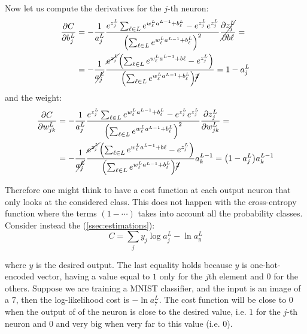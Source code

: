 Now let us compute the derivatives for the $j$-th neuron:
\begin{equation}
\begin{aligned}
\frac{\pr C}{\pr b\jL} &= -\frac{1}{a\jL} \frac{e^{z\jL}\sum_{\ell \in L}e^{ w_{\ell}^L a^{L-1}+b_\ell^L} -e^{z\jL}e^{z\jL}}{\br{\sum_{\ell \in L}e^{ w_{\ell}^L a^{L-1} +b_\ell^L}}^2} \cancel{\frac{\pr z\jL}{\pr b\ell}} = \\
&= -\frac{1}{\cancel{a\jL}} \frac{ \cancel{e^{z\jL}} \br{\sum_{\ell \in L}e^{ w_{\ell}^L a^{L-1} +b\ell} -e^{z\jL}}}{\br{\sum_{\ell \in L}e^{ w_{\ell}^L a^{L-1} +b_\ell^L}}\cancel{^2}}= 1- a\jL
\end{aligned}
\end{equation}
and the weight:
\begin{equation}
\begin{aligned}
\frac{\pr C}{\pr w_{jk}^L} &= -\frac{1}{a\jL} \frac{e^{z\jL}\sum_{\ell \in L}e^{ w_{\ell}^L a^{L-1}+b_\ell^L} -e^{z\jL}e^{z\jL}}{\br{\sum_{\ell \in L}e^{ w_{\ell}^L a^{L-1} +b_\ell^L}}^2} \frac{\pr z\jL}{\pr w_{jk}^L} = \\
&= -\frac{1}{\cancel{a\jL}} \frac{ \cancel{e^{z\jL}} \br{\sum_{\ell \in L}e^{ w_{\ell}^L a^{L-1} +b\ell} -e^{z\jL}}}{\br{\sum_{\ell \in L}e^{ w_{\ell}^L a^{L-1} +b_\ell^L}}\cancel{^2}} a_k^{L-1}= \br{1- a\jL} a_k^{L-1}
\end{aligned}
\end{equation}

Therefore one might think to have a cost function at each output neuron that only looks at the considered class. This does not happen with the cross-entropy function where the terms $(1-\cdots)$ takes into account all the probability classes. Consider instead the  (\autoref{ssec:estimations}):
\begin{equation}
C = \sum_j y_j \log a^L_j -\ln a_y^L
\end{equation}

where $y$ is the desired output. The last equality holds because $y$ is one-hot-encoded vector, having a value equal to $1$ only for the $j$th element and $0$ for the others. Suppose we are training a MNIST classifier, and the input is an image of a $7$, then the log-likelihood cost is $-\ln a^L_7$.  The cost function will be close to $0$ when the output of  of the neuron is close to the desired value, i.e. $1$ for the $j$-th neuron and $0$ and very big when very far to this value (i.e. $0$).

